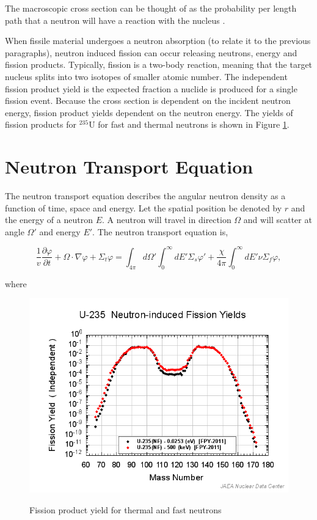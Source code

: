 \noindent The macroscopic cross section can be thought of as the probability per length path that a neutron will have a reaction with the nucleus \cite{duderstadt1976}. 

When fissile material undergoes a neutron absorption (to relate it to the previous paragraphs), neutron induced fission can occur releasing neutrons, energy and fission products. Typically, fission is a two-body reaction, meaning that the target nucleus splits into two isotopes of smaller atomic number. The independent fission product yield is the expected fraction a nuclide is produced for a single fission event. Because the cross section is dependent on the incident neutron energy, fission product yields dependent on the neutron energy. The yields of fission products for ${}^{235}$U for fast and thermal neutrons is shown in Figure \ref{fig:fissionYield}.



\section{Neutron Transport Equation}
The neutron transport equation describes the angular neutron density as a function of time, space and energy. Let the spatial position be denoted by $r$ and the energy of a neutron $E$. A neutron will travel in direction $\Omega$ and will scatter at angle $\Omega'$ and energy $E'$.  The neutron transport equation is,

\begin{equation}
    \frac{1}{v}\frac{\partial \varphi}{\partial t} + \Omega \cdot \nabla \varphi + \Sigma_{t}\varphi = \int_{4\pi} d\Omega'\int_{0}^{\infty}dE'\Sigma_{s}\varphi' + \frac{\chi}{4\pi}\int_{0}^{\infty}dE'\nu\Sigma_{f}\varphi,
    \label{eq:angularNeutronTransport}
\end{equation}

\noindent where 

\clearpage

\begin{figure}[t]
  \centering
  \includegraphics[width=5.5in]{images/chapter-2/fissionYield.png}\\
  \caption{Fission product yield for thermal and fast neutrons}
  \label{fig:fissionYield}
\end{figure} 

